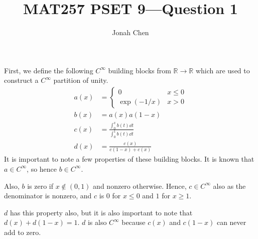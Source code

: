\documentclass{exam}
\title{MAT257 PSET 9---Question 1}
\author{Jonah Chen}
\date{}
\numberwithin{equation}{section}
\newcommand{\R}{\mathbb{R}}
\begin{document}
    \sffamily
    \maketitle
    First, we define the following $C^\infty$ building blocks from $\R\to\R$ which are used to construct a $C^\infty$ partition of unity. 
    \begin{align*}
        a(x)&=\begin{cases}
            0 & x\leq 0\\
            \exp(-1/x) & x>0
        \end{cases}\\
        b(x)&=a(x)a(1-x)\\
        c(x)&=\frac{\int_{0}^{x}b(t)\dd t}{\int_{0}^1b(t)\dd t}\\
        d(x)&=\frac{c(x)}{c(1-x)+c(x)}
    \end{align*}
    It is important to note a few properties of these building blocks. It is known that $a\in C^\infty$, so hence $b\in C^\infty$. 
    
    Also, $b$ is zero if $x\notin(0,1)$ and nonzero otherwise. Hence, $c\in C^\infty$ also as the denominator is nonzero, and $c$ is $0$ for $x\leq0$ and $1$ for $x\geq1$. 
    
    $d$ has this property also, but it is also important to note that $d(x)+d(1-x)=1$. $d$ is also $C^\infty$ because $c(x)$ and $c(1-x)$ can never add to zero.
\end{document}
